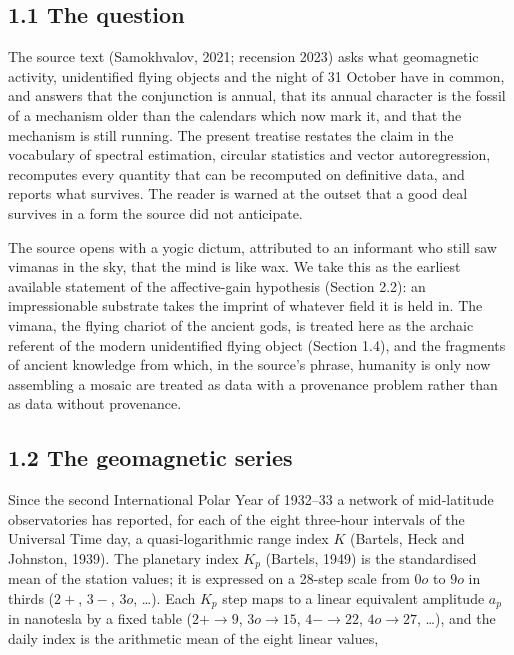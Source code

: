 \documentclass[
  10pt,
  a4paper,
]{article}
\begin{document}
\hypertarget{the-question}{%
\subsection{1.1 The question}\label{the-question}}

The source text (Samokhvalov, 2021; recension 2023) asks what
geomagnetic activity, unidentified flying objects and the night of 31
October have in common, and answers that the conjunction is annual, that
its annual character is the fossil of a mechanism older than the
calendars which now mark it, and that the mechanism is still running.
The present treatise restates the claim in the vocabulary of spectral
estimation, circular statistics and vector autoregression, recomputes
every quantity that can be recomputed on definitive data, and reports
what survives. The reader is warned at the outset that a good deal
survives in a form the source did not anticipate.

The source opens with a yogic dictum, attributed to an informant who
still saw vimanas in the sky, that the mind is like wax. We take this as
the earliest available statement of the affective-gain hypothesis
(Section 2.2): an impressionable substrate takes the imprint of whatever
field it is held in. The vimana, the flying chariot of the ancient gods,
is treated here as the archaic referent of the modern unidentified
flying object (Section 1.4), and the fragments of ancient knowledge from
which, in the source's phrase, humanity is only now assembling a mosaic
are treated as data with a provenance problem rather than as data
without provenance.

\hypertarget{the-geomagnetic-series}{%
\subsection{1.2 The geomagnetic series}\label{the-geomagnetic-series}}

Since the second International Polar Year of 1932--33 a network of
mid-latitude observatories has reported, for each of the eight
three-hour intervals of the Universal Time day, a quasi-logarithmic
range index \(K\) (Bartels, Heck and Johnston, 1939). The planetary
index \(K_p\) (Bartels, 1949) is the standardised mean of the station
values; it is expressed on a 28-step scale from \(0o\) to \(9o\) in
thirds (\(2+\), \(3-\), \(3o\), \ldots). Each \(K_p\) step maps to a
linear equivalent amplitude \(a_p\) in nanotesla by a fixed table
(\(2+ \to 9\), \(3o \to 15\), \(4- \to 22\), \(4o \to 27\), \ldots), and
the daily index is the arithmetic mean of the eight linear values,
\end{document}

